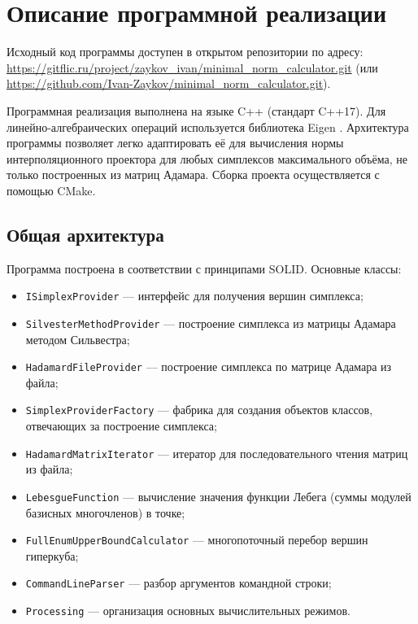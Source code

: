 \documentclass[main]{subfiles}
\begin{document}
\section{Описание программной реализации}

Исходный код программы доступен в открытом репозитории по адресу:
\url{https://gitflic.ru/project/zaykov_ivan/minimal_norm_calculator.git} (или \url{https://github.com/Ivan-Zaykov/minimal_norm_calculator.git}).

Программная реализация выполнена на языке C++ (стандарт C++17). Для линейно-алгебраических операций используется библиотека Eigen \cite{eigen_lib}. Архитектура программы позволяет легко адаптировать её для вычисления нормы интерполяционного проектора для любых симплексов максимального объёма, не только построенных из матриц Адамара. Сборка проекта осуществляется с помощью CMake.

\subsection{Общая архитектура}

Программа построена в соответствии с принципами SOLID. Основные классы:

\begin{itemize}
    \item \texttt{ISimplexProvider} — интерфейс для получения вершин симплекса;
    \item \texttt{SilvesterMethodProvider} — построение симплекса из матрицы Адамара методом Сильвестра;
    \item \texttt{HadamardFileProvider} — построение симплекса по матрице Адамара из файла;
    \item \texttt{SimplexProviderFactory} — фабрика для создания объектов классов, отвечающих за построение симплекса;
    \item \texttt{HadamardMatrixIterator} — итератор для последовательного чтения матриц из файла;
    \item \texttt{LebesgueFunction} — вычисление значения функции Лебега (суммы модулей базисных многочленов) в точке;
    \item \texttt{FullEnumUpperBoundCalculator} — многопоточный перебор вершин гиперкуба;
    \item \texttt{CommandLineParser} — разбор аргументов командной строки;
    \item \texttt{Processing} — организация основных вычислительных режимов.
\end{itemize}
\end{document}
